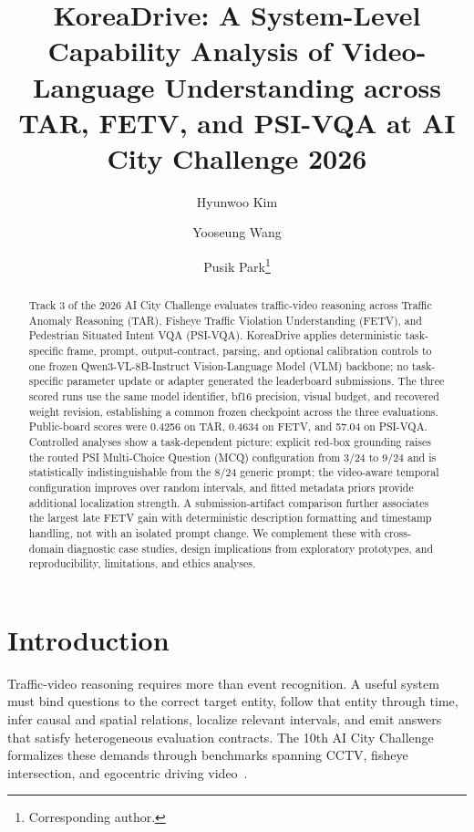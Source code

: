 \documentclass[runningheads]{llncs}
\newcommand{\qwen}{Qwen3-VL-8B-\allowbreak Instruct\xspace}
\begin{document}
\title{KoreaDrive: A System-Level Capability Analysis of Video-Language Understanding across TAR, FETV, and PSI-VQA at AI City Challenge 2026}

\author{Hyunwoo Kim \and Yooseung Wang \and Pusik Park\thanks{Corresponding author.}}

\maketitle
\begin{abstract}
Track 3 of the 2026 AI City Challenge evaluates traffic-video reasoning across Traffic Anomaly Reasoning (TAR), Fisheye Traffic Violation Understanding (FETV), and Pedestrian Situated Intent VQA (PSI-VQA). KoreaDrive applies deterministic task-specific frame, prompt, output-contract, parsing, and optional calibration controls to one frozen \qwen Vision-Language Model (VLM) backbone; no task-specific parameter update or adapter generated the leaderboard submissions. The three scored runs use the same model identifier, bf16 precision, visual budget, and recovered weight revision, establishing a common frozen checkpoint across the three evaluations. Public-board scores were 0.4256 on TAR, 0.4634 on FETV, and 57.04 on PSI-VQA. Controlled analyses show a task-dependent picture: explicit red-box grounding raises the routed PSI Multi-Choice Question (MCQ) configuration from 3/24 to 9/24 and is statistically indistinguishable from the 8/24 generic prompt; the video-aware temporal configuration improves over random intervals, and fitted metadata priors provide additional localization strength. A submission-artifact comparison further associates the largest late FETV gain with deterministic description formatting and timestamp handling, not with an isolated prompt change.
We complement these with cross-domain diagnostic case studies, design implications from exploratory prototypes, and reproducibility, limitations, and ethics analyses.
\end{abstract}

\section{Introduction}
Traffic-video reasoning requires more than event recognition. A useful system must bind questions to the correct target entity, follow that entity through time, infer causal and spatial relations, localize relevant intervals, and emit answers that satisfy heterogeneous evaluation contracts. The 10th AI City Challenge formalizes these demands through benchmarks spanning CCTV, fisheye intersection, and egocentric driving video~\cite{aicity2026track3,tang2026aicity}.
\end{document}
